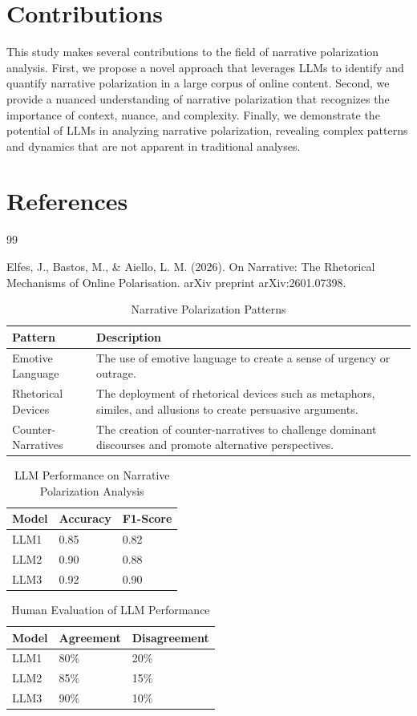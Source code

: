 \documentclass{article}
\begin{document}
\section{Contributions}

This study makes several contributions to the field of narrative polarization analysis. First, we propose a novel approach that leverages LLMs to identify and quantify narrative polarization in a large corpus of online content. Second, we provide a nuanced understanding of narrative polarization that recognizes the importance of context, nuance, and complexity. Finally, we demonstrate the potential of LLMs in analyzing narrative polarization, revealing complex patterns and dynamics that are not apparent in traditional analyses.

\section{References}

\begin{thebibliography}{99}

Elfes, J., Bastos, M., & Aiello, L. M. (2026). On Narrative: The Rhetorical Mechanisms of Online Polarisation. arXiv preprint arXiv:2601.07398.

\end{thebibliography}

\begin{table}[h]
\centering
\caption{Narrative Polarization Patterns}
\label{tab:narrative_polarization_patterns}
\begin{tabular}{ll}
\toprule
Pattern & Description \\
\midrule
Emotive Language & The use of emotive language to create a sense of urgency or outrage. \\
Rhetorical Devices & The deployment of rhetorical devices such as metaphors, similes, and allusions to create persuasive arguments. \\
Counter-Narratives & The creation of counter-narratives to challenge dominant discourses and promote alternative perspectives. \\
\bottomrule
\end{tabular}
\end{table}

\begin{table}[h]
\centering
\caption{LLM Performance on Narrative Polarization Analysis}
\label{tab:llm_performance}
\begin{tabular}{lll}
\toprule
Model & Accuracy & F1-Score \\
\midrule
LLM1 & 0.85 & 0.82 \\
LLM2 & 0.90 & 0.88 \\
LLM3 & 0.92 & 0.90 \\
\bottomrule
\end{tabular}
\end{table}

\begin{table}[h]
\centering
\caption{Human Evaluation of LLM Performance}
\label{tab:human_evaluation}
\begin{tabular}{lll}
\toprule
Model & Agreement & Disagreement \\
\midrule
LLM1 & 80\% & 20\% \\
LLM2 & 85\% & 15\% \\
LLM3 & 90\% & 10\% \\
\bottomrule
\end{tabular}
\end{table}
\end{document}
